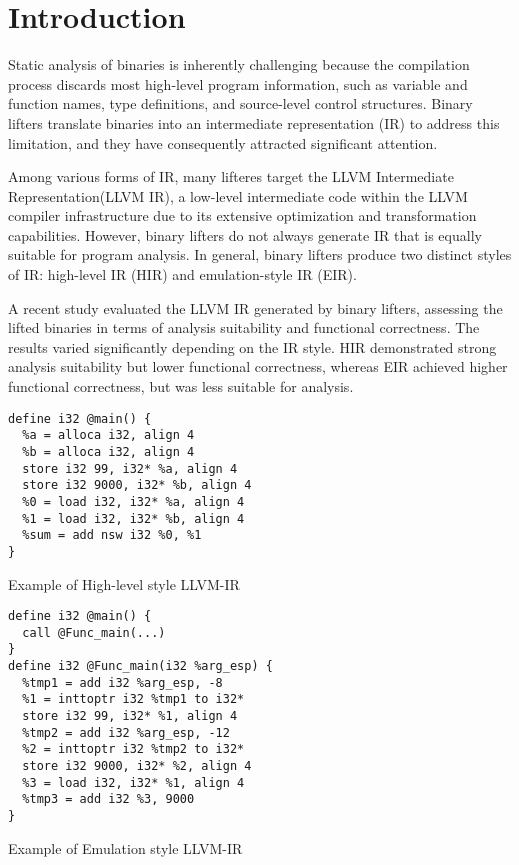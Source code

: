 \section{Introduction}
Static analysis of binaries is inherently challenging because the compilation
process discards most high-level program information\cite{compiler-level-ir}, such as variable and
function names, type definitions, and source-level control structures. Binary
lifters translate binaries into an intermediate representation (IR) to address
this limitation, and they have consequently attracted significant attention.

Among various forms of IR, many lifteres target the LLVM Intermediate
Representation(LLVM IR), a low-level intermediate code within the LLVM compiler
infrastructure due to its extensive optimization and transformation
capabilities. However, binary lifters do not always generate IR that is equally
suitable for program analysis. In general, binary lifters produce two distinct
styles of IR: high-level IR (HIR) and emulation-style IR (EIR). 

A recent study evaluated the LLVM IR generated by binary lifters, assessing the
lifted binaries in terms of analysis suitability and functional
correctness\cite{snp-sok}. The results varied significantly depending on the IR
style. HIR demonstrated strong analysis suitability but lower functional
correctness, whereas EIR achieved higher functional correctness, but was less
suitable for analysis.

\begin{listing}[ht]
\begin{verbatim}
define i32 @main() {
  %a = alloca i32, align 4
  %b = alloca i32, align 4
  store i32 99, i32* %a, align 4
  store i32 9000, i32* %b, align 4
  %0 = load i32, i32* %a, align 4
  %1 = load i32, i32* %b, align 4
  %sum = add nsw i32 %0, %1
}
\end{verbatim}
\caption{Example of High-level style LLVM-IR}
\label{lst:hir}
\end{listing}

\begin{listing}[ht]
\begin{verbatim}
define i32 @main() {
  call @Func_main(...)
}
define i32 @Func_main(i32 %arg_esp) {
  %tmp1 = add i32 %arg_esp, -8
  %1 = inttoptr i32 %tmp1 to i32*
  store i32 99, i32* %1, align 4
  %tmp2 = add i32 %arg_esp, -12
  %2 = inttoptr i32 %tmp2 to i32*
  store i32 9000, i32* %2, align 4
  %3 = load i32, i32* %1, align 4 
  %tmp3 = add i32 %3, 9000
}
\end{verbatim}
\caption{Example of Emulation style LLVM-IR}
\label{lst:eir}
\end{listing}

